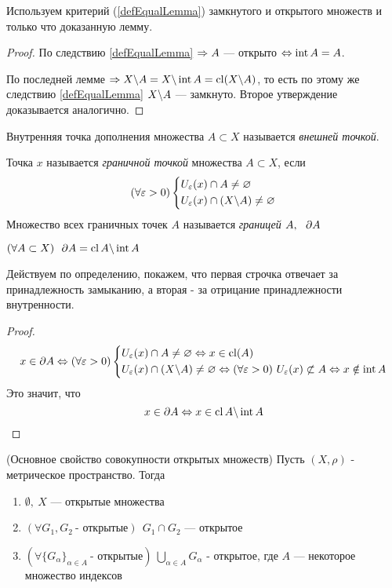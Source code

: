 \begin{idea}
	Используем критерий (\ref{defEqualLemma}) замкнутого
	и открытого множеств и только что доказанную лемму.
\end{idea}

\begin{proof}
	По следствию \ref{defEqualLemma} $\Rightarrow A$ --- открыто $\Leftrightarrow
	\operatorname{int} A = A$.
	
	По последней лемме $\Rightarrow X \backslash A = X \backslash \operatorname{int} A
	= \operatorname{cl} (X \backslash A)$, то есть по этому же следствию \ref{defEqualLemma}
	$X \backslash A$ --- замкнуто. Второе утверждение доказывается аналогично.
\end{proof}

\begin{definition}
	Внутренняя точка дополнения множества $A \subset X$
	называется \textit{внешней точкой}.
\end{definition}

\begin{definition}
	Точка $x$ называется \textit{граничной точкой} множества
	$A \subset X$, если
	\[
		(\forall \varepsilon > 0)
		\left\{\begin{aligned}
			&U_\varepsilon(x) \cap A \neq \varnothing \\
			&U_\varepsilon(x) \cap (X \backslash A) \neq \varnothing
		\end{aligned}\right.
	\]
	Множество всех граничных точек $A$ называется
	\textit{границей} $A,\ \ \partial A$
\end{definition}

\begin{lemma}
	$(\forall A \subset X)\ \ \partial A = \operatorname{cl} A \backslash \operatorname{int} A$
\end{lemma}

\begin{idea}
	Действуем по определению, покажем, что первая строчка отвечает
	за принадлежность замыканию, а вторая - за отрицание
	принадлежности внутренности.
\end{idea}

\begin{proof}
	\[
	x \in \partial A \Leftrightarrow (\forall \varepsilon > 0)
	\left\{\begin{aligned}
		&U_\varepsilon(x) \cap A \neq \varnothing \Leftrightarrow x \in \operatorname{cl}(A)\\
		&U_\varepsilon(x) \cap (X \backslash A) \neq \varnothing \Leftrightarrow
		(\forall \varepsilon > 0)\ U_\varepsilon(x) \not\subset A \Leftrightarrow x \notin \operatorname{int} A
	\end{aligned}\right.
	\]
	Это значит, что
	\[
		x \in \partial A \Leftrightarrow x \in \operatorname{cl} A \backslash \operatorname{int} A
	\]
\end{proof}

\begin{theorem} (Основное свойство совокупности открытых множеств) \label{mainProp}
	Пусть $(X, \rho)$ - метрическое пространство. Тогда
	\begin{enumerate}
		\item $\emptyset,\ X$ --- открытые множества
		
		\item $(\forall G_1, G_2\ \text{- открытые})\ \ 
			G_1 \cap G_2 $ --- открытое
		
		\item $(\forall \{G_\alpha\}_{\alpha \in A}\ \text{- открытые})
			\ \bigcup\limits_{\alpha \in A}
			G_\alpha$ - открытое, где $A$ --- некоторое множество
			индексов
	\end{enumerate}
\end{theorem}

